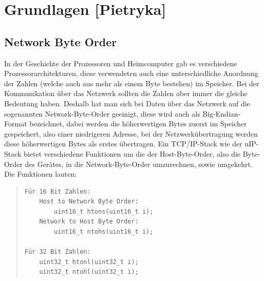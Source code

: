 \documentclass[a4paper,14pt,headsepline]{scrartcl}
\begin{document}
\begin{figure}[h]
\begin{center}
\end{center}
\end{figure}

\newpage

\section{Grundlagen [Pietryka]}
\subsection{Network Byte Order}
In der Geschichte der Prozessoren und Heimcomputer gab es verschiedene Prozessorarchitekturen, diese verwendeten auch eine unterschiedliche Anordnung der Zahlen (welche auch aus mehr als einem Byte bestehen) im Speicher. Bei  der Kommunikation über das Netzwerk sollten die Zahlen aber immer die gleiche Bedeutung haben. Deshalb hat man sich bei Daten über das Netzwerk auf die sogenannten Network-Byte-Order geeinigt, diese wird auch als Big-Endian-Format bezeichnet, dabei werden die höherwertigen Bytes zuerst im Speicher gespeichert, also einer niedrigeren Adresse, bei der Netzwerkübertragung werden diese höherwertigen Bytes als erstes übertragen. Ein TCP/IP-Stack wie der uIP-Stack bietet verschiedene Funktionen um die der Host-Byte-Order, also die Byte-Order des Gerätes, in die Network-Byte-Order umzurechnen, sowie umgekehrt. Die Funktionen lauten:
\begin{quote}
\begin{verbatim}
Für 16 Bit Zahlen:
    Host to Network Byte Order:
        uint16_t htons(uint16_t i);
    Network to Host Byte Order:
        uint16_t ntohs(uint16_t i);

Für 32 Bit Zahlen:
    uint32_t htonl(uint32_t i);
    uint32_t ntohl(uint32_t i);
\end{verbatim}
\end{quote}
\end{document}
